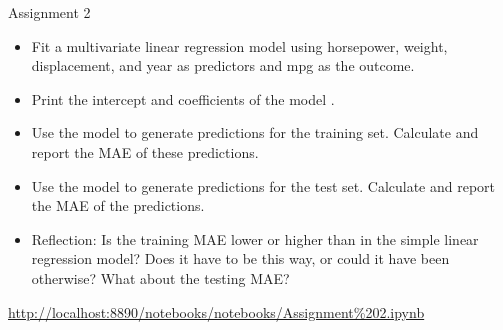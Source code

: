\documentclass[8pt]{beamer}
\begin{document}
\begin{frame}{Assignment 2}
{\begin{itemize}
                \item Fit a multivariate linear regression model using horsepower, weight, displacement, and year as predictors and mpg as the outcome.
                \item Print the intercept and coefficients of the model .
                \item Use the model to generate predictions for the training set. Calculate and report the MAE of these predictions.
                \item Use the model to generate predictions for the test set. Calculate and report the MAE of the predictions.
                \item Reflection: Is the training MAE lower or higher than in the simple linear regression model? Does it have to be this way, or could it have been otherwise? What about the testing MAE?
            \end{itemize}
            \vspace{0.5cm}
            \url{http://localhost:8890/notebooks/notebooks/Assignment\%202.ipynb}
        }
    \end{frame}
\end{document}
